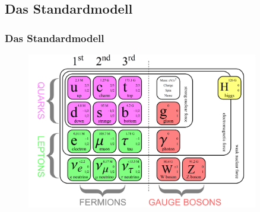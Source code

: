 \subsection{Das Standardmodell}
 \begin{frame}
 	\frametitle{Das Standardmodell}
 	\begin{figure}
 	\begin{center}
 	  \includegraphics[width=0.9\textwidth]{graphics/SM1.png}
 	\end{center}
	\end{figure}
 \end{frame}
